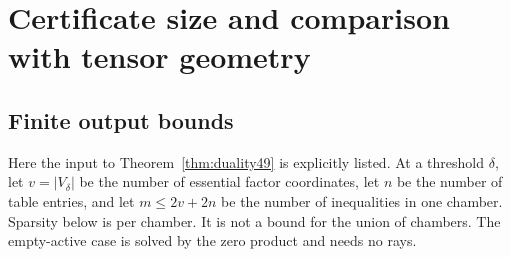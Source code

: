 \section{Certificate size and comparison with tensor geometry}
\label{sec:complexity50}
\subsection{Finite output bounds}
Here the input to Theorem~\ref{thm:duality49} is explicitly listed.
At a threshold $\delta$, let $v=|V_\delta|$ be the number of essential
factor coordinates, let $n$ be the number of table entries, and let
$m\le2v+2n$ be the number of inequalities in one chamber. Sparsity
below is per chamber. It is not a bound for the union of chambers.
The empty-active case is solved by the zero product and needs no rays.

